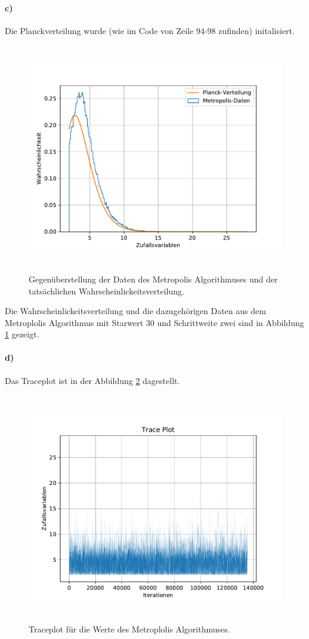 \paragraph{c)}
Die Planckverteilung wurde (wie im Code von Zeile 94-98 zufinden) initalisiert.
%
\begin{figure}
  \centering
  \includegraphics[height = 10cm]{plots/Planckvergleich.pdf}
  \caption{Gegenüberstellung der Daten des Metropolis Algorithmuses und der tatsächlichen Wahrscheinlickeitsverteilung.}
  \label{fig:Pvgl}
\end{figure}
Die Wahrscheinlickeitsverteilung und die dazugehörigen Daten aus dem Metroplolis
Algorithmus mit Starwert 30 und Schrittweite zwei sind in Abbildung \ref{fig:Pvgl} gezeigt.
\paragraph{d)}
Das Traceplot ist in der Abbildung \ref{fig:Trace} dagestellt.
\begin{figure}
  \centering
  \includegraphics[height = 10cm]{plots/Traceplot.pdf}
  \caption{Traceplot für die Werte des Metroplolis Algorithmuses.}
  \label{fig:Trace}
\end{figure}
